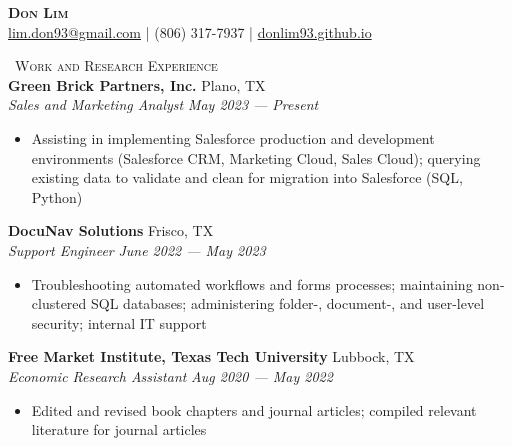 \documentclass[a4paper,11pt]{article}
\newcommand{\header} [1] {
    \vspace*{1mm}
    {\textsc{\large{\xrfill[0.1ex]{0.5pt}~#1~\xrfill[0.1ex]{0.5pt}}}} %
    \vspace*{1mm}
}
\begin{document}
\vspace*{-40pt}
\fontsize{10.5}{12}\selectfont

\vspace*{-3mm}
\begin{center}
    {\Huge\textbf\textsc{{{Don Lim}}}}\\
    \href{mailto:lim.don93@gmail.com}{\Letter\space lim.don93@gmail.com} | \Mobilefone\space (806) 317-7937 | \href{https://donlim93.github.io/}{\space donlim93.github.io} \\
\end{center}

\header{Work and Research Experience} \\
\textbf{Green Brick Partners, Inc.} \hfill Plano, TX \\
\textit{Sales and Marketing Analyst} \hfill  \emph{May 2023 --- Present} \\
\begin{itemize}
    \item Assisting in implementing Salesforce production and development environments (Salesforce CRM, Marketing Cloud, Sales Cloud); querying existing data to validate and clean for migration into Salesforce (SQL, Python)
\end{itemize}
\vspace{1mm}

\textbf{DocuNav Solutions} \hfill Frisco, TX \\
\textit{Support Engineer} \hfill  \emph{June 2022 --- May 2023} \\
\begin{itemize}
    \item Troubleshooting automated workflows and forms processes; maintaining non-clustered SQL databases; administering folder-, document-, and user-level security; internal IT support
\end{itemize}    
\vspace{1mm}

\textbf{Free Market Institute, Texas Tech University} \hfill Lubbock, TX\\
\textit{Economic Research Assistant} \hfill  \emph{Aug 2020 --- May 2022} \\
\begin{itemize}
    \item Edited and revised book chapters and journal articles; compiled relevant literature for journal articles
\end{itemize}
\vspace{1mm}
\end{document}
